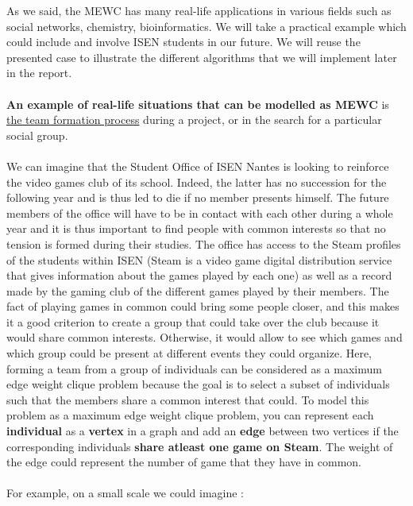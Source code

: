 \documentclass{article}
\begin{document}
    As we said, the MEWC has many real-life applications in various fields such as social networks, chemistry, bioinformatics. We will take a practical example which could include and involve ISEN students in our future. We will reuse the presented case to illustrate the different algorithms that we will implement later in the report.\\ \\
    \textbf{An example of real-life situations that can be modelled as MEWC} is \underline{the team formation process} during a project, or in the search for a particular social group. 
    \\ \\
    We can imagine that the Student Office of ISEN Nantes is looking to reinforce the video games club of its school. Indeed, the latter has no succession for the following year and is thus led to die if no member presents himself. The future members of the office will have to be in contact with each other during a whole year and it is thus important to find people with common interests so that no tension is formed during their studies. The office has access to the Steam profiles of the students within ISEN (Steam is a video game digital distribution service that gives information about the games played by each one) as well as a record made by the gaming club of the different games played by their members. The fact of playing games in common could bring some people closer, and this makes it a good criterion to create a group that could take over the club because it would share common interests. Otherwise, it would allow to see which games and which group could be present at different events they could organize. Here, forming a team from a group of individuals can be considered as a maximum edge weight clique problem because the goal is to select a subset of individuals such that the members share a common interest that could.
    \newpage
    To model this problem as a maximum edge weight clique problem, you can represent each \textbf{individual} as a \textbf{vertex} in a graph and add an \textbf{edge} between two vertices if the corresponding individuals \textbf{share atleast one game on Steam}. The weight of the edge could represent the number of game that they have in common.
    \\ \\
    For example, on a small scale we could imagine :
    \\ \\
\end{document}
